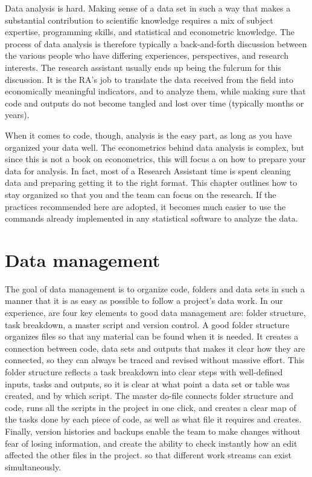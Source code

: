 
\begin{fullwidth}
Data analysis is hard. Making sense of a data set in such a way
that makes a substantial contribution to scientific knowledge
requires a mix of subject expertise, programming skills,
and statistical and econometric knowledge.
The process of data analysis is therefore typically
a back-and-forth discussion between the various people
who have differing experiences, perspectives, and research interests.
The research assistant usually ends up being the fulcrum for this discussion.
It is the RA's job to translate the data received from the field
into economically meaningful indicators, and to analyze them,
while making sure that code and outputs do not become
tangled and lost over time (typically months or years).

When it comes to code, though, analysis is the easy part, 
as long as you have organized your data well.
The econometrics behind data analysis is complex,
but since this is not a book on econometrics, 
this will focus a on how to prepare your data for analysis.
In fact, most of a Research Assistant time is spent cleaning data 
and preparing getting it to the right format.
This chapter outlines how to stay organized
so that you and the team can focus on the research.
If the practices recommended here are adopted,
it becomes much easier to use the commands already implemented
in any statistical software to analyze the data.

\end{fullwidth}


\section{Data management}

The goal of data management is to organize 
code, folders and data sets in such a manner that 
it is as easy as possible to follow a project's data work.
In our experience, are four key elements to good data management are:
folder structure, task breakdown, a master script and version control.
A good folder structure organizes files
so that any material can be found when it is needed.
It creates a connection between code, data sets and outputs
that makes it clear how they are connected, 
so they can always be traced and revised without massive effort.
This folder structure reflects a task breakdown into clear steps
with well-defined inputs, tasks and outputs,
so it is clear at what point a data set or table was created,
and by which script.
The master do-file connects folder structure and code,
runs all the scripts in the project in one click, 
and creates a clear map of the tasks done by each piece of code,
as well as what file it requires and creates.
Finally, version histories and backups enable the team
to make changes without fear of losing information,
and create the ability to check instantly how an edit affected the other files in the project.
so that different work streams can exist simultaneously.

